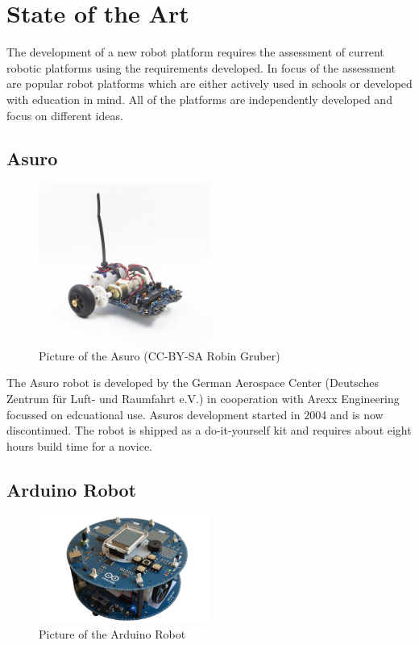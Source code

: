 \documentclass[twocolumn]{article}
\begin{document}
\section{State of the Art}
The development of a new robot platform requires the assessment of current robotic platforms using the requirements developed. In focus of the assessment are popular robot platforms which are either actively used in schools or developed with education in mind. All of the platforms are independently developed and focus on different ideas. 

\subsection{Asuro}
\begin{figure}[h!]
  \centering
  \includegraphics[width=0.5\textwidth]{images/asuro.jpg}
  \caption{Picture of the Asuro (CC-BY-SA Robin Gruber)}
\end{figure}

The Asuro robot is developed by the German Aerospace Center (Deutsches Zentrum für Luft- und Raumfahrt e.V.) in cooperation with Arexx Engineering focussed on edcuational use. Asuros development started in 2004 and is now discontinued. The robot is shipped as a do-it-yourself kit and requires about eight hours build time for a novice. 

\subsection{Arduino Robot}
\begin{figure}[h!]
  \centering
  \includegraphics[width=0.5\textwidth]{images/arduinorobot.jpg}
  \caption{Picture of the Arduino Robot}
\end{figure}
\end{document}
